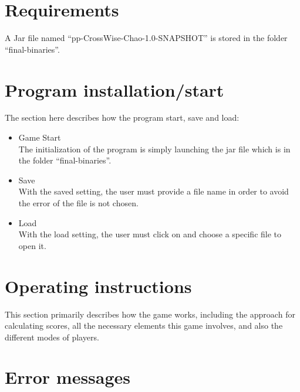 \section{Requirements}

A Jar file named “pp-CrossWise-Chao-1.0-SNAPSHOT” is stored in the folder “final-binaries”.

\section{Program installation/start}

The section here describes how the program start, save and load: 

	\begin{itemize}
	\item {Game Start}\\
    The initialization of the program is simply launching the jar file which is in the folder “final-binaries”.

	\item {Save}\\
	With the saved setting, the user must provide a file name in order to avoid the error of the file is not chosen.  
	
	\item {Load}\\
	With the load setting, the user must click on and choose a specific file to open it. 
	

\end{itemize}

\section{Operating instructions}

This section primarily describes how the game works, including the approach for calculating scores, all the necessary elements this game involves, and also the different modes of players. 








\newpage
\section{Error messages}



\newpage


\newpage


\newpage

